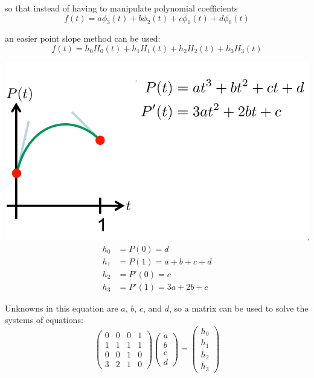 \documentclass[12pt]{article}
\begin{document}
so that instead of having to manipulate polynomial coefficients
\[ f(t) = a\phi_3(t) + b\phi_2(t) + c\phi_1(t) + d\phi_0(t) \]

an easier point slope method can be used:
\[ f(t) = h_0H_0(t) + h_1H_1(t) + h_2H_2(t) + h_3H_3(t) \]

\includegraphics[scale=.5]{images/cubic-hermite-interpolation.png}
\begin{align*}
    h_0 &= P(0) = d\\
    h_1 &= P(1) = a + b + c + d\\
    h_2 &= P'(0) = c\\
    h_3 &= P'(1) = 3a + 2b + c
\end{align*}

Unknowns in this equation are $a$, $b$, $c$, and $d$, so a matrix can be used
to solve the systems of equations:
\[
    \begin{pmatrix}
        0 & 0 & 0 & 1\\
        1 & 1 & 1 & 1\\
        0 & 0 & 1 & 0\\
        3 & 2 & 1 & 0
    \end{pmatrix}
    \begin{pmatrix}
        a\\
        b\\
        c\\
        d
    \end{pmatrix}
    =
    \begin{pmatrix}
        h_0\\
        h_1\\
        h_2\\
        h_3
    \end{pmatrix}
\]
\end{document}
